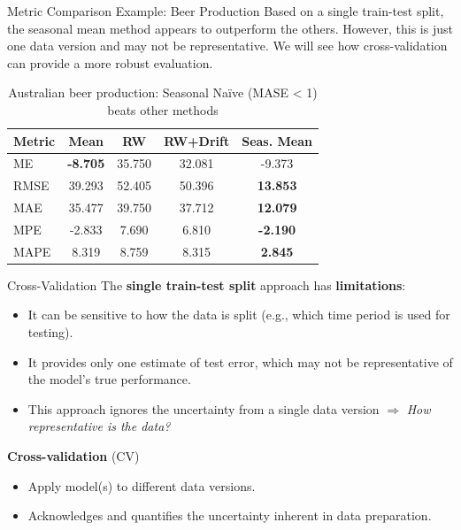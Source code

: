 \documentclass[11pt]{beamer}
\begin{document}
\begin{frame}{Metric Comparison Example: Beer Production}
	Based on a single train-test split, the seasonal mean method appears to outperform the others. However, this is just one data version and may not be representative. We will see how cross-validation can provide a more robust evaluation.
	\vspace{0.25cm}

	\begin{table}
		\centering
        \begin{tabular}{lcccc}
            \toprule
            \textbf{Metric} & \textbf{Mean} & \textbf{RW} & \textbf{RW+Drift} & \textbf{Seas. Mean} \\
            \midrule
            ME   & \textbf{-8.705} & 35.750 & 32.081 & -9.373 \\
            RMSE & 39.293 & 52.405 & 50.396 & \textbf{13.853} \\
            MAE  & 35.477 & 39.750 & 37.712 & \textbf{12.079} \\
            MPE  & -2.833 & 7.690  & 6.810  & \textbf{-2.190} \\
            MAPE & 8.319  & 8.759  & 8.315  & \textbf{2.845} \\
            \bottomrule
        \end{tabular}
		\caption{Australian beer production: Seasonal Naïve (MASE < 1) beats other methods}
	\end{table}
\end{frame}

\begin{frame}{Cross-Validation}
	The \textbf{single train-test split} approach has \textbf{limitations}:
    \begin{itemize}
        \item It can be sensitive to how the data is split (e.g., which time period is used for testing).
        \item It provides only one estimate of test error, which may not be representative of the model's true performance.
        \item This approach ignores the uncertainty from a single data version $\Rightarrow$ \textit{How representative is the data?}
    \end{itemize}
	\medskip

	\textbf{Cross-validation} (CV)
	\begin{itemize}
        \item Apply model(s) to different data versions.
        \item Acknowledges and quantifies the uncertainty inherent in data preparation.
    \end{itemize}
\end{frame}
\end{document}
